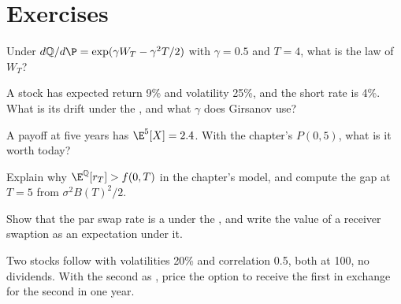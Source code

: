 \section{Exercises}

\begin{exercise}[$\star$]\label{exo:qm:girsanov-and-changes-of-numeraire:1}
Under $d\mathbb Q/d\P = \exp(\gamma W_T - \gamma^2T/2)$ with $\gamma = 0.5$ and $T = 4$, what is the law of $W_T$?
\end{exercise}

\begin{exercise}[$\star$]\label{exo:qm:girsanov-and-changes-of-numeraire:2}
A stock has expected return 9\% and volatility 25\%, and the short rate is 4\%. What is its drift under
the , and what $\gamma$ does Girsanov use?
\end{exercise}

\begin{exercise}[$\star$]\label{exo:qm:girsanov-and-changes-of-numeraire:3}
A payoff at five years has $\E^{5}[X] = 2.4$. With the chapter's $P(0, 5)$, what is it worth today?
\end{exercise}

\begin{exercise}[$\star\star$]\label{exo:qm:girsanov-and-changes-of-numeraire:4}
Explain why $\E^{\mathbb Q}[r_T] > f(0, T)$ in the chapter's model, and compute the gap at $T = 5$ from
$\sigma^2B(T)^2/2$.
\end{exercise}

\begin{exercise}[$\star\star$]\label{exo:qm:girsanov-and-changes-of-numeraire:5}
Show that the par swap rate is a  under the , and write the value of a
receiver swaption as an expectation under it.
\end{exercise}

\begin{exercise}[$\star\star$]\label{exo:qm:girsanov-and-changes-of-numeraire:6}
Two stocks follow  with volatilities 20\% and correlation 0.5, both at 100,
no dividends. With the second as , price the option to receive the first in exchange for
the second in one year.
\end{exercise}

